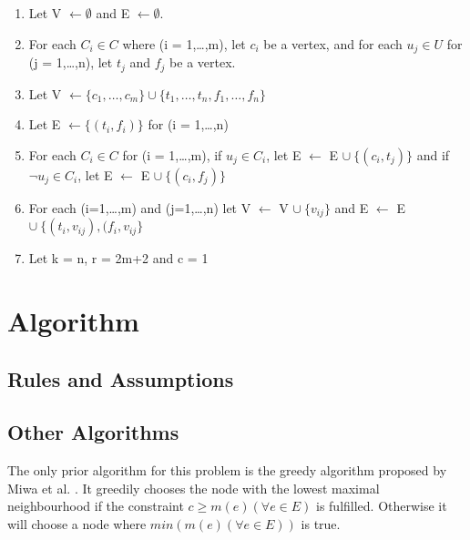 \documentclass [12pt]{article}
\begin{document}
\begin{enumerate}
  \item{Let V $\leftarrow \emptyset$ and E $\leftarrow \emptyset$.}
  \item{For each $C_i \in C$ where (i = 1,\dots,m), let $c_i$ be a vertex, and for each $u_j \in U$ for (j = 1,\dots,n),
    let $t_j$ and $f_j$ be a vertex.}
  \item {Let V $\leftarrow \{c_1, \dots, c_m\} \cup \{t_1, \dots, t_n, f_1, \dots, f_n\} $ }
  \item {Let E $\leftarrow \{(t_i,f_i)\}$ for (i = 1,\dots,n) }
  \item {For each $C_i \in C$ for (i = 1,\dots,m), if $u_j \in C_i$, let E $\leftarrow$ E $\cup \ \{ (c_i ,t_j) \}$
    and if $\neg u_j \in C_i$, let E $\leftarrow$ E $\cup \ \{(c_i,f_j)\}$ }
  \item{For each (i=1,\dots,m) and (j=1,\dots,n) let V $\leftarrow$  V $\cup \ \{v_{ij}\}$ and E $\leftarrow$ E $\cup \ \{(t_i,v_{ij}), (f_i, v_{ij} \}$ }
  \item{Let k = n, r = 2m+2 and c = 1}
    
  
\end{enumerate}





\section{Algorithm}
\subsection{Rules and Assumptions}
\subsection{Other Algorithms}
The only prior algorithm for this problem is the greedy algorithm proposed by
Miwa et al. \cite{mirrorserver}. It greedily chooses the node with the 
lowest maximal neighbourhood if the constraint $c\geq m(e) (\forall e \in E)$ is fulfilled. 
Otherwise it will choose a node where $min(m(e)(\forall e \in E))$ is true.
\end{document}
